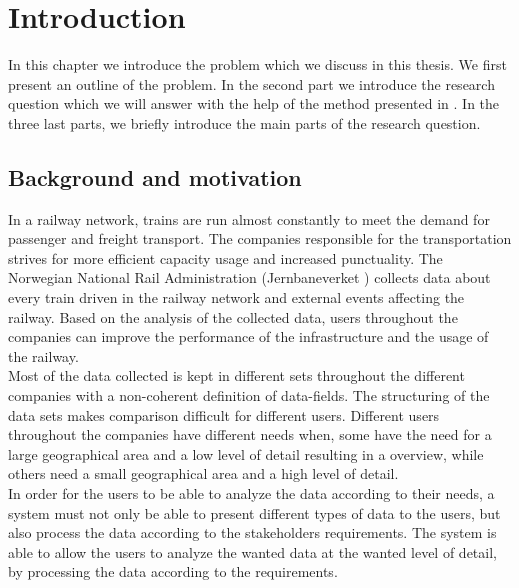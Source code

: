
\chapter{Introduction}
\label{chapter:introduction}

In this chapter we introduce the problem which we discuss in this thesis.
We first present an outline of the problem. In the second part we introduce 
the research question which we will answer with the help of the method 
presented in . In the three last parts, 
we briefly introduce the main parts of the research question.

\section{Background and motivation} %
\label{sec:background_and_motivation}
In a railway network, trains are run almost constantly to meet the demand for 
passenger and freight transport. The companies responsible for the 
transportation strives for more efficient capacity usage and increased 
punctuality. The Norwegian National Rail Administration (Jernbaneverket 
\cite{jernbaneverketAbout}) collects data about every train driven in the 
railway network and external events affecting the railway. 
Based on the analysis of the collected data, users throughout the companies 
can improve the performance of the infrastructure and the usage of the 
railway.\\

Most of the data collected is kept in different sets throughout the different
companies with a non-coherent definition of data-fields. The structuring of 
the data sets makes comparison difficult for different users. Different users
throughout the companies have different needs when, some have
the need for a large geographical area and a low level of detail resulting in a
overview, while others need a small geographical area and a high level of 
detail. \\

In order for the users to be able to analyze the data according to their 
needs, a system must not only be able to present different types of data to the
users, but also process the data according to the stakeholders requirements. 
The system is able to allow the users to analyze the wanted data at the wanted 
level of detail, by processing the data according to the requirements.

